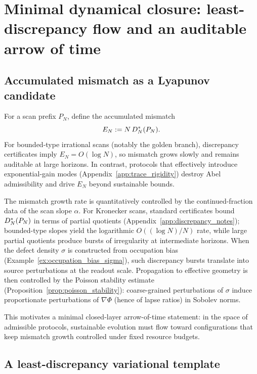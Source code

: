 
\section{Minimal dynamical closure: least-discrepancy flow and an auditable arrow of time}
\label{sec:dynamics}

\subsection{Accumulated mismatch as a Lyapunov candidate}
\label{sec:mismatch_lyapunov}

For a scan prefix $P_N$, define the accumulated mismatch
\[
E_N := N\,D_N^\ast(P_N).
\]
For bounded-type irrational scans (notably the golden branch), discrepancy certificates imply $E_N=O(\log N)$, so mismatch grows slowly and remains auditable at large horizons.
In contrast, protocols that effectively introduce exponential-gain modes (Appendix~\ref{app:trace_rigidity}) destroy Abel admissibility and drive $E_N$ beyond sustainable bounds.

\begin{remark}
\label{rem:slope_sensitivity}
The mismatch growth rate is quantitatively controlled by the continued-fraction data of the scan slope $\alpha$.
For Kronecker scans, standard certificates bound $D_N^\ast(P_N)$ in terms of partial quotients (Appendix~\ref{app:discrepancy_notes}); bounded-type slopes yield the logarithmic $O((\log N)/N)$ rate, while large partial quotients produce bursts of irregularity at intermediate horizons.
When the defect density $\sigma$ is constructed from occupation bias (Example~\ref{ex:occupation_bias_sigma}), such discrepancy bursts translate into source perturbations at the readout scale.
Propagation to effective geometry is then controlled by the Poisson stability estimate (Proposition~\ref{prop:poisson_stability}): coarse-grained perturbations of $\sigma$ induce proportionate perturbations of $\nabla\Phi$ (hence of lapse ratios) in Sobolev norms.
\end{remark}

This motivates a minimal closed-layer arrow-of-time statement:
in the space of admissible protocols, sustainable evolution must flow toward configurations that keep mismatch growth controlled under fixed resource budgets.

\subsection{A least-discrepancy variational template}
\label{sec:least_discrepancy_template}

